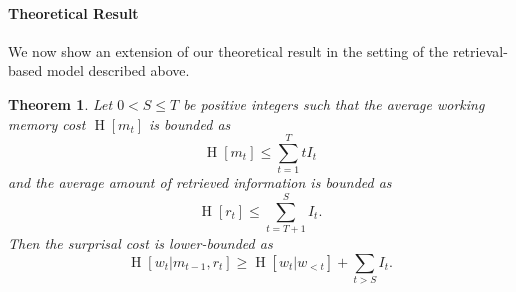 \documentclass[11pt,letterpaper]{article}
\newcounter{theorem}
\newtheorem{thm}[theorem]{Theorem}
\begin{document}

\paragraph{Theoretical Result}
We now show an extension of our theoretical result in the setting of the retrieval-based model described above.

\begin{thm}
Let $0 < S \leq T$ be positive integers such that the average working memory cost $\operatorname{H}[m_t]$ is bounded as
	\begin{equation}
		\operatorname{H}[m_t] \leq \sum_{t=1}^T t I_t
	\end{equation}
	and the average amount of retrieved information is bounded as
	\begin{equation}
		\operatorname{H}[r_t] \leq \sum_{t=T+1}^S I_t.
	\end{equation} %
	Then the surprisal cost is lower-bounded as
	\begin{equation}
		\operatorname{H}[w_t|m_{t-1}, r_t] \geq \operatorname{H}[w_t|w_{<t}] + \sum_{t>S} I_t.
	\end{equation}
\end{thm}
\end{document}
